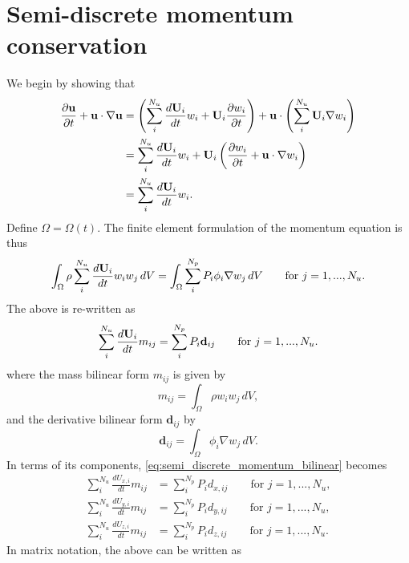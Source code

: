 \documentclass[11pt]{article}
\begin{document}
\section{Semi-discrete momentum conservation}
We begin by showing that
\begin{align}
    \frac{\partial \mathbf{u}}{\partial t} + \mathbf{u} \cdot \nabla \mathbf{u} &= \left ( \sum_i^{N_u} \frac{d \mathbf{U}_i}{d t} w_i + \mathbf{U}_i \frac{\partial w_i}{\partial t} \right ) + \mathbf{u} \cdot \left ( \sum_i^{N_u} \mathbf{U}_i \nabla w_i \right ) \nonumber \\
    &= \sum_i^{N_u} \frac{d \mathbf{U}_i}{d t} w_i + \mathbf{U}_i \left ( \frac{\partial w_i}{\partial t} + \mathbf{u} \cdot \nabla w_i \right ) \nonumber \\
    &= \sum_i^{N_u} \frac{d \mathbf{U}_i}{d t} w_i.
\end{align}
Define $\Omega = \Omega(t)$. The finite element formulation of the momentum equation is thus 
\begin{equation}
    \int_\Omega \rho \sum_i^{N_u} \frac{d \mathbf{U}_i}{d t} w_i w_j \, dV = \int_\Omega \sum_i^{N_p} P_i \phi_i \nabla w_j \, dV \qquad \text{for } j = 1,...,N_u.
\end{equation}
The above is re-written as
\begin{equation}
    \label{eq:semi_discrete_momentum_bilinear}
    \sum_i^{N_u} \frac{d \mathbf{U}_i}{d t} m_{ij} = \sum_i^{N_p} P_i \mathbf{d}_{ij} \qquad \text{for } j = 1,...,N_u.
\end{equation}
where the mass bilinear form $m_{ij}$ is given by 
\begin{equation}
    m_{ij} = \int_\Omega \rho w_i w_j \, dV,
\end{equation}
and the derivative bilinear form $\mathbf{d}_{ij}$ by 
\begin{equation}
    \mathbf{d}_{ij} = \int_\Omega \phi_i \nabla w_j \, dV.
\end{equation}
In terms of its components, \cref{eq:semi_discrete_momentum_bilinear} becomes
\begin{align}
    \sum_i^{N_u} \frac{d U_{x,i}}{d t} m_{ij} &= \sum_i^{N_p} P_i d_{x,ij} \qquad \text{for } j = 1,...,N_u, \nonumber \\
    \sum_i^{N_u} \frac{d U_{y,i}}{d t} m_{ij} &= \sum_i^{N_p} P_i d_{y,ij} \qquad \text{for } j = 1,...,N_u, \nonumber \\
    \sum_i^{N_u} \frac{d U_{z,i}}{d t} m_{ij} &= \sum_i^{N_p} P_i d_{z,ij} \qquad \text{for } j = 1,...,N_u.
\end{align}
In matrix notation, the above can be written as 
\end{document}
